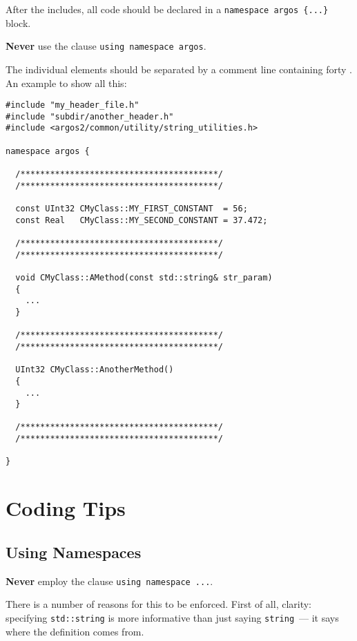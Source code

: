 \documentclass[a4paper]{article}
\begin{document}
After the includes, all code should be declared in a
\lstinline!namespace argos {...}! block.
%
\begin{warning}
  {\bf Never} use the clause \lstinline!using namespace argos!.
\end{warning}

The individual elements should be separated by a comment line
containing forty {\it *}. An example to show all this:
%
\begin{lstlisting}
#include "my_header_file.h"
#include "subdir/another_header.h"
#include <argos2/common/utility/string_utilities.h>

namespace argos {

  /****************************************/
  /****************************************/

  const UInt32 CMyClass::MY_FIRST_CONSTANT  = 56;
  const Real   CMyClass::MY_SECOND_CONSTANT = 37.472;

  /****************************************/
  /****************************************/

  void CMyClass::AMethod(const std::string& str_param)
  {
    ...
  }

  /****************************************/
  /****************************************/

  UInt32 CMyClass::AnotherMethod()
  {
    ...
  }

  /****************************************/
  /****************************************/

}
\end{lstlisting}

\section{Coding Tips}
\label{sec:coding}

\subsection{Using Namespaces}
\label{subsec:namespaces}
\begin{warning}
  {\bf Never} employ the clause \lstinline!using namespace ...!.
\end{warning}
There is a number of reasons for this to be enforced. First of all,
clarity: specifying \lstinline!std::string! is more informative than
just saying \lstinline!string!~--- it says where the definition comes
from.
\end{document}
